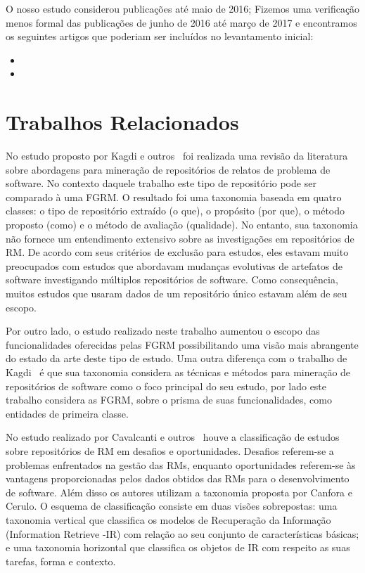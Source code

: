 O nosso estudo considerou publicações até maio de 2016; Fizemos uma verificação
menos formal das publicações de junho de 2016 até março de 2017 e encontramos os
seguintes artigos que poderiam ser incluídos no levantamento inicial:

\begin{itemize}
	\item 
	\item
\end{itemize}

\section{Trabalhos Relacionados}
\label{sec:map_trabalhos_relacionados}

No estudo proposto por Kagdi e outros~\cite{kagdi2012assigning} foi realizada
uma revisão da literatura sobre abordagens para mi\-ne\-ra\-ção de repositórios de
relatos de problema de software. No contexto daquele trabalho este tipo de
repositório pode ser comparado à uma FGRM\@. O resultado foi uma taxonomia
baseada em quatro classes: o tipo de repositório extraído (o que), o propósito
(por que), o método proposto (como) e o método de avaliação (qualidade). No
entanto, sua taxonomia não fornece um entendimento extensivo sobre as
investigações em repositórios de RM\@. De acordo com seus critérios de exclusão
para estudos, eles estavam muito preocupados com estudos que abordavam mudanças
evolutivas de artefatos de software investigando múltiplos repositórios de
software. Como consequência, muitos estudos que usaram dados de um repositório
único estavam além de seu escopo.

Por outro lado, o estudo realizado neste trabalho aumentou o escopo das
funcionalidades oferecidas pelas FGRM possibilitando uma visão mais abrangente
do estado da arte deste tipo de estudo. Uma outra diferença com o trabalho de
Kagdi~\cite{kagdi2012assigning} é que sua taxonomia considera as técnicas e
métodos para mineração de repositórios de software como o foco principal do seu
estudo, por lado este trabalho considera as FGRM, sobre o prisma de suas
funcionalidades, como entidades de primeira classe.

No estudo realizado por Cavalcanti e outros~\cite{cavalcanti2014challenges}
houve a classificação de estudos sobre repositórios de RM em desafios e
oportunidades.  Desafios referem-se a problemas enfrentados na gestão das RMs,
enquanto oportunidades referem-se às vantagens proporcionadas pelos dados
obtidos das  RMs para o desenvolvimento de software. Além disso os autores
utilizam a taxonomia proposta por Canfora e Cerulo\cite{cerulo2004taxonomy}. O
esquema de classificação consiste em duas visões sobrepostas: uma taxonomia
vertical que classifica os modelos de Recuperação da Informação (Information
Retrieve \@-\@ IR) com relação ao seu conjunto de características básicas; e uma
taxonomia horizontal que classifica os objetos de IR com respeito as suas
tarefas, forma e contexto.

